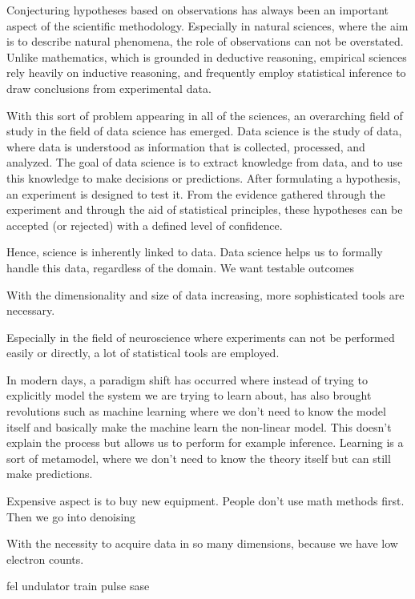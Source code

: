 Conjecturing hypotheses based on observations has always been an important aspect of the scientific methodology. Especially in natural sciences, where the aim is to describe natural phenomena, the role of observations can not be overstated. Unlike mathematics, which is grounded in deductive reasoning, empirical sciences rely heavily on inductive reasoning, and frequently employ statistical inference to draw conclusions from experimental data.

With this sort of problem appearing in all of the sciences, an overarching field of study in
the field of data science has emerged. Data science is the study of data, where data is understood as information that is collected, processed, and analyzed. The goal of data science is to extract knowledge from data, and to use this knowledge to make decisions or predictions.
\cite{ackermannOperationFreeelectronLaser2007}
After formulating a hypothesis, an experiment is designed to test it. From the evidence gathered through the experiment and through the aid of statistical principles, these hypotheses can be accepted (or rejected) with a defined level of confidence.

Hence, science is inherently linked to data. Data science helps us to formally handle this data, regardless of the domain. We want testable outcomes

With the dimensionality and size of data increasing, more sophisticated tools are necessary. 

Especially in the field of neuroscience where experiments can not be performed easily or directly, a lot of statistical tools are employed.

In modern days, a paradigm shift has occurred where instead of trying to explicitly model the system we are trying to learn about, 
has also brought revolutions such as machine learning where we don't need to know the model itself and basically make the machine learn the non-linear model. This doesn't explain the process but allows us to perform for example inference. Learning is a sort of metamodel, where we don't need to know the theory itself but can still make predictions.


Expensive aspect is to buy new equipment. People don't use math methods first.
Then we go into denoising 

With the necessity to acquire data in so many dimensions, because we have low electron counts.

\gls{fel} \gls{undulator} \gls{train} \gls{pulse} \gls{sase}
